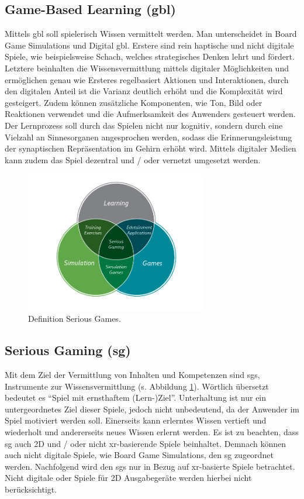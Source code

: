 \documentclass[conference]{IEEEtran}
\begin{document}
\subsection{Game-Based Learning (\gls{gbl})}
Mittels \gls{gbl} soll spielerisch Wissen vermittelt werden. Man unterscheidet in Board Game Simulations und Digital \gls{gbl}.
Erstere sind rein haptische und nicht digitale Spiele, wie beispielsweise Schach, welches strategisches Denken lehrt und fördert.
Letztere beinhalten die Wissensvermittlung mittels digitaler Möglichkeiten und ermöglichen genau wie Ersteres regelbasiert Aktionen und Interaktionen,
durch den digitalen Anteil ist die Varianz deutlich erhöht und die Komplexität wird gesteigert.
Zudem können zusätzliche Komponenten, wie Ton, Bild oder Reaktionen verwendet und die Aufmerksamkeit des Anwenders gesteuert werden.
Der Lernprozess soll durch das Spielen nicht nur kognitiv, sondern durch eine Vielzahl an Sinnesorganen angesprochen werden, sodass die Erinnerungsleistung der
synaptischen Repräsentation im Gehirn erhöht wird\cite{fabulagames}.
Mittels digitaler Medien kann zudem das Spiel dezentral und / oder vernetzt umgesetzt werden\cite{a3}.

\begin{figure}[htbp]
\centerline{\includegraphics[width=8cm]{serious-games.png}}
\caption{Definition Serious Games.\cite{a10}}
\label{sgdef_fig}
\end{figure}


\subsection{Serious Gaming (\gls{sg})}
Mit dem Ziel der Vermittlung von Inhalten und Kompetenzen sind \gls{sg}s, Instrumente zur Wissensvermittlung (s. Abbildung \ref{sgdef_fig}).
Wörtlich übersetzt bedeutet es ``Spiel mit ernsthaftem (Lern-)Ziel''.
Unterhaltung ist nur ein untergeordnetes Ziel dieser Spiele, jedoch nicht unbedeutend, da der Anwender im Spiel motiviert werden soll.
Einerseits kann erlerntes Wissen vertieft und wiederholt und andererseits neues Wissen erlernt werden.
Es ist zu beachten, dass \gls{sg} auch 2D und / oder nicht \gls{xr}-basierende Spiele beinhaltet.
Demnach können auch nicht digitale Spiele, wie Board Game Simulations, den \gls{sg} zugeordnet werden.
Nachfolgend wird den \gls{sg}s nur in Bezug auf \gls{xr}-basierte Spiele betrachtet.
Nicht digitale oder Spiele für 2D Ausgabegeräte werden hierbei nicht berücksichtigt.
\end{document}
